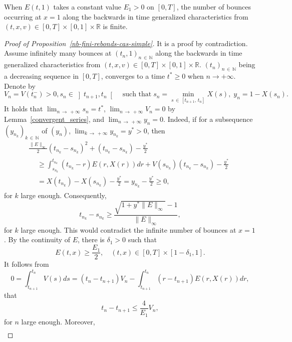 \documentclass[10pt]{amsart}
\theoremstyle{definition}\newtheorem{defi}[theo]{Definition}\newtheorem{rema}[theo]{Remark}\newtheorem{exam}[theo]{Example}\newtheorem{exem}[theo]{Example}\newtheorem{nota}[theo]{Notation}
\newcommand{\R}{\mathbb{R}}
\newcommand{\N}{\mathbb{N}}
\begin{document}
\begin{prop}\label{nb-fini-rebonds-cas-simple}
When $E(t,1)$ takes a constant value $E_1>0$ on $[0,T]$, the number of bounces occurring at $x=1$ along the backwards in time generalized characteristics from $(t,x,v)\in [0,T] \times [0,1] \times \R $ is finite.
\end{prop}

\begin{proof}[{Proof of Proposition~\ref{nb-fini-rebonds-cas-simple}}]
It is a proof by contradiction. Assume infinitely many bounces at $(t_n,1)_{n\,\in\,\N}$ along the backwards in time generalized characteristics from $(t,x,v)\in [0,T]
\times [0,1] \times \R $. $(t_n)_{n\,\in\,\N}$ being a decreasing sequence in $[0,T]$, converges to a time $t^* \geq 0$ when $n \to +\infty $. Denote by
\[
V_n = V\left(t_n^-\right) > 0, s_n \in\left]t_{n+1},t_n\right[\quad \text{such that}\; s_n= \min_{s\,\in\,\left[t_{n+1},\,t_n\right]} X(s),\; y_n = 1-X\left(s_n\right).
\]
It holds that $\lim_{n\,\to\,+\infty} s_n = t^*$, $\lim_{n\,\to\,+\infty} V_n = 0$ by Lemma~\ref{convergent_series}, and $\lim_{n\,\to\,+\infty} y_n = 0$. Indeed, if for a subsequence $(y_{n_k})_{k\,\in\,\N}$ of $(y_n)$, $\lim_{k\,\to\,+\infty} y_{n_k} = y^*> 0$, then
\begin{multline*}
\frac{\| E\|_\infty }{2}(t_{n_k}-s_{n_k})^2+\left(t_{n_k}-s_{n_k}\right)-\frac{y^*}{2}\\
\begin{aligned}
&\geq \int _{s_{n_k}}^{t_{n_k}}\left(t_{n_k}-r\right)E(r,X(r))dr+V\left(s_{n_k}\right)\left(t_{n_k}-s_{n_k}\right)-\frac{y^*}{2}\\
&= X\left(t_{n_k}\right)-X\left(s_{n_k}\right)-\frac{y^*}{2}= y_{n_k}-\frac{y^*}{2}\geq 0,
\end{aligned}
\end{multline*}
for $k$ large enough. Consequently,
\[
t_{n_k}-s_{n_k}\geq \frac{\sqrt{1+y^*\|E\|_\infty }-1}{\|E\|_\infty },
\]
for $k$ large enough. This would contradict the infinite number of bounces at $x=1$. 
By the continuity of $E$, there is $\delta_1>0$ such that
\[
E(t,x) \geq \frac{E_1}{2}, \quad (t,x) \in [0,T] \times \left[1-\delta_1,1\right].
\]
It follows from
\[
0 = \int_{t_{n+1}}^{t_n} V(s)ds = \left(t_n - t_{n+1}\right) V_n - \int_{t_{n+1}}^{t_n} \left(r - t_{n+1}\right) E(r,X(r))dr,
\]
that
\begin{equation}\label{asymp_t_n-cas-simple}
t_n - t_{n+1} \leq \frac{4}{E_1}V_n,
\end{equation}
for $n$ large enough. Moreover,
\begin{align*}

\end{align*}
\end{proof}
\end{document}
